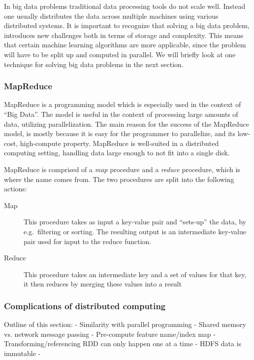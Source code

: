 In big data problems traditional data processing tools do not scale well. Instead one usually distributes the data across multiple machines using various distributed systems. It is important to recognize that solving a big data problem, introduces new challenges both in terms of storage and complexity. This means that certain machine learning algorithms are more applicable, since the problem will have to be split up and computed in parallel.  We will briefly look at one technique for solving big data problems in the next section.

\subsubsection{MapReduce} %
\label{sec:mapreduce_programming_model}

MapReduce is a programming model which is especially used in the context of ``Big Data''. The model is useful in the context of processing large amounts of data, utilizing parallelization. The main reason for the success of the MapReduce model, is mostly because it is easy for the programmer to parallelize, and its low-cost, high-compute property. MapReduce is well-suited in a distributed computing setting, handling data large enough to not fit into a single disk.

MapReduce is comprised of a \emph{map} procedure and a \emph{reduce} procedure, which is where the name comes from. The two procedures are split into the following actions:


\begin{description}
    \item[Map] This procedure takes as input a key-value pair and ``sets-up'' the data, by e.g.\ filtering or sorting. The resulting output is an intermediate key-value pair used for input to the reduce function.
    \item[Reduce] This procedure takes an intermediate key and a set of values for that key, it then reduces by merging these values into a result
\end{description}

\subsubsection{Complications of distributed computing}

Outline of this section:
- Similarity with parallel programming
    - Shared memory vs. network message passing
- Pre-compute feature name/index map
- Transforming/referencing RDD can only happen one at a time
- HDFS data is immutable
- 








